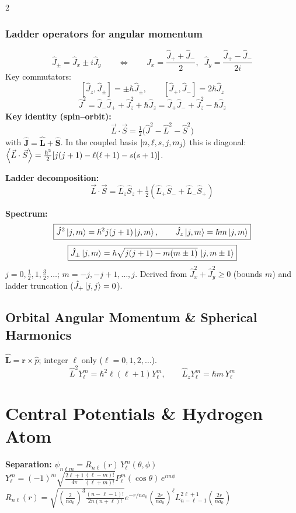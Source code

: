 \documentclass[9pt,a4paper]{article} %
\newcommand{\phat}{\hat{p}}
\newcommand{\Lop}{\hat{\mathbf{L}}}
\newcommand{\Sop}{\hat{\mathbf{S}}}
\begin{document}
\begin{multicols}{2}
\subsubsection{Ladder operators for angular momentum}
\[
\boxed{\hat{J}_{\pm}=\hat{J}_x\pm i\hat{J}_y}\qquad\Leftrightarrow\qquad
\hat{J}_x=\frac{\hat{J}_++\hat{J}_-}{2},\;\;\hat{J}_y=\frac{\hat{J}_+-\hat{J}_-}{2i}
\]
Key commutators:
\[
[\hat{J}_z,\hat{J}_{\pm}]=\pm\hbar\hat{J}_{\pm},\qquad [\hat{J}_+,\hat{J}_-]=2\hbar\hat{J}_z
\]
\[
\hat{J}^2=\hat{J}_-\hat{J}_++\hat{J}_z^2+\hbar\hat{J}_z=\hat{J}_+\hat{J}_-+\hat{J}_z^2-\hbar\hat{J}_z
\]
\textbf{Key identity (spin--orbit):}
\[
\boxed{\vec{L}\cdot\vec{S}=\tfrac{1}{2}\bigl(\hat{J}^2-\hat{L}^2-\hat{S}^2\bigr)}
\]
with $\hat{\mathbf{J}}=\Lop+\Sop$.  In the coupled basis $\ket{n,\ell,s,j,m_j}$ this is diagonal:
$\ev{\vec{L}\cdot\vec{S}}=\frac{\hbar^2}{2}[j(j+1)-\ell(\ell+1)-s(s+1)]$.

\textbf{Ladder decomposition:}
\[
\vec{L}\cdot\vec{S}=\hat{L}_z\hat{S}_z+\tfrac{1}{2}\!\left(\hat{L}_+\hat{S}_-+\hat{L}_-\hat{S}_+\right)
\]

\textbf{Spectrum:}
\[
\boxed{\hat{J}^2\ket{j,m}=\hbar^2 j(j+1)\ket{j,m},\qquad \hat{J}_z\ket{j,m}=\hbar m\ket{j,m}}
\]
\[
\boxed{\hat{J}_{\pm}\ket{j,m}=\hbar\sqrt{j(j+1)-m(m\pm 1)}\,\ket{j,m\pm 1}}
\]
$j=0,\frac{1}{2},1,\frac{3}{2},\ldots$;\; $m=-j,-j+1,\ldots,j$.\;
Derived from $\hat{J}_x^2+\hat{J}_y^2\ge 0$ (bounds $m$) and ladder truncation ($\hat{J}_+\ket{j,j}=0$).

\subsection{Orbital Angular Momentum \& Spherical Harmonics}
$\Lop=\mathbf{r}\times\phat$; integer $\ell$ only ($\ell=0,1,2,\ldots$).
\[
\hat{L}^2 Y_\ell^m=\hbar^2\ell(\ell+1)Y_\ell^m,\qquad \hat{L}_z Y_\ell^m=\hbar m\,Y_\ell^m
\]

\section{Central Potentials \& Hydrogen Atom}


\textbf{Separation:} $\psi_{n\ell m} = R_{n\ell}(r)\,Y_\ell^m(\theta,\phi)$\\
$Y_\ell^m=(-1)^m\sqrt{\frac{2\ell+1}{4\pi}\frac{(\ell-m)!}{(\ell+m)!}}P_\ell^m(\cos\theta)\,e^{im\phi}$\\
$R_{n\ell}(r) = \sqrt{\left(\frac{2}{na_0}\right)^3 \frac{(n-\ell-1)!}{2n(n+\ell)!}} e^{-r/na_0} \left(\frac{2r}{na_0}\right)^\ell L_{n-\ell-1}^{2\ell+1}\left(\frac{2r}{na_0}\right)$


\end{multicols}
\end{document}
